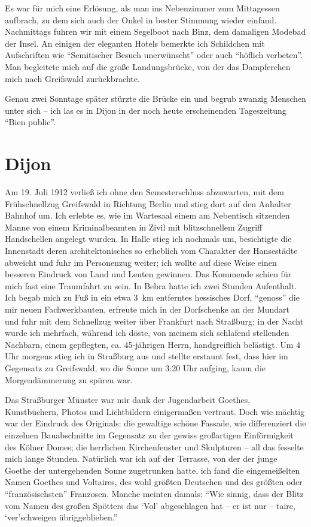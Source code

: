 \documentclass[a5paper,pagesize,10pt,twoside=true]{scrbook}
\begin{document}
Es war für mich eine Erlösung, als man ins Nebenzimmer zum Mittagessen aufbrach, zu dem sich auch der Onkel in bester Stimmung wieder einfand. Nachmittags fuhren wir mit einem Segelboot nach Binz, dem damaligen Modebad der Insel. An einigen der eleganten Hotels bemerkte ich Schildchen mit Aufschriften wie \enquote{Semitischer Besuch unerwünscht} oder auch \enquote{höflich verbeten}. Man begleitete mich auf die große Landungsbrücke, von der das Dampferchen mich nach Greifswald zurückbrachte.

Genau zwei Sonntage später stürzte die Brücke ein und begrub zwanzig Menschen unter sich -- ich las es in Dijon in der noch heute erscheinenden Tageszeitung \enquote{Bien public}.


\section{Dijon}

Am 19. Juli 1912 verließ ich ohne den Semesterschluss abzuwarten, mit dem Frühschnellzug Greifswald in Richtung Berlin und stieg dort auf den Anhalter Bahnhof um. Ich erlebte es, wie im Wartesaal einem am Nebentisch sitzenden Manne von einem Kriminalbeamten in Zivil mit blitzschnellem Zugriff Handschellen angelegt wurden. In Halle stieg ich nochmals um, besichtigte die Innenstadt deren architektonisches so erheblich vom Charakter der Hansestädte abweicht und fuhr im Personenzug weiter; ich wollte auf diese Weise einen besseren Eindruck von Land und Leuten gewinnen. Das Kommende schien für mich fast eine Traumfahrt zu sein. In Bebra hatte ich zwei Stunden Aufenthalt. Ich begab mich zu Fuß in ein etwa 3~km entferntes hessisches Dorf, \enquote{genoss} die mir neuen Fachwerkbauten, erfreute mich in der Dorfschenke an der Mundart und fuhr mit dem Schnellzug weiter über Frankfurt nach Straßburg; in der Nacht wurde ich mehrfach, während ich döste, von meinem sich schlafend stellenden Nachbarn, einem gepflegten, ca. 45-jährigen Herrn, handgreiflich belästigt. Um 4 Uhr morgens stieg ich in Straßburg aus und stellte erstaunt fest, dass hier im Gegensatz zu Greifswald, wo die Sonne um 3:20 Uhr aufging, kaum die Morgendämmerung zu spüren war.

Das Straßburger Münster war mir dank der Jugendarbeit Goethes, Kunstbüchern, Photos und Lichtbildern einigermaßen vertraut. Doch wie mächtig war der Eindruck des Originals: die gewaltige schöne Fassade, wie differenziert die einzelnen Bauabschnitte im Gegensatz zu der gewiss großartigen Einförmigkeit des Kölner Domes; die herrlichen Kirchenfenster und Skulpturen -- all das fesselte mich lange Stunden. Natürlich war ich auf der Terrasse, von der der junge Goethe der untergehenden Sonne zugetrunken hatte, ich fand die eingemeißelten Namen Goethes und Voltaires, des wohl größten Deutschen und des größten oder \enquote{französischsten} Franzosen. Manche meinten damals: \enquote{Wie sinnig, dass der Blitz vom Namen des großen Spötters das \enquote{Vol} abgeschlagen hat -- er ist nur -- taire, \enquote{ver}schweigen übriggeblieben.}
\end{document}
